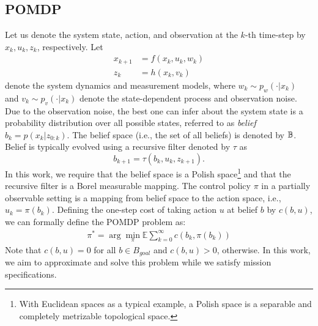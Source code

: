 \documentclass[letterpaper]{article} %
\begin{document}
	\subsection{POMDP}
	Let us denote the system state, action, and observation at the $k$-th time-step by $x_k, u_k, z_k$, respectively. Let
	\begin{align}
	x_{k+1} &= f(x_k,u_k,w_k) \label{eq:dynamics} \\
	z_k &= h(x_k,v_k) \label{eq:observations}
	\end{align}
	denote the system dynamics and measurement models, where $w_k\sim p_w(\cdot|x_k)$ and $v_k\sim p_v(\cdot|x_k)$ denote the state-dependent process and observation noise. Due to the observation noise, the best one can infer about the system state is a probability distribution over all possible states, referred to as \emph{belief} $b_k=p(x_k|z_{0:k})$. The belief space (i.e., the set of all beliefs) is denoted by $\mathbb{B}$. Belief is typically evolved using a recursive filter denoted by $\tau$ as
	\begin{equation}
	\label{eq:filter}
	b_{k+1}=\tau(b_k,u_k,z_{k+1}).
	\end{equation}
    In this work, we require that the belief space is a Polish space\footnote{With Euclidean spaces as a typical example, a Polish space is a separable and completely metrizable topological space.} and that the recursive filter is a Borel measurable mapping.
%
%
    The control policy $\pi$ in a partially observable setting is a mapping from belief space to the action space, i.e., $u_k=\pi(b_k)$. Defining the one-step cost of taking action $u$ at belief $b$ by $c(b,u)$, we can formally define the POMDP problem as: 
    \begin{align}
    \pi^*=\arg\min_\pi\mathbb{E}\sum_{k=0}^{\infty}c(b_k,\pi(b_k))
    \end{align}
    Note that $c(b,u)=0$ for all $b\in B_{goal}$ and $c(b,u)>0$, otherwise. In this work, we aim to approximate and solve this problem while we satisfy mission specifications.
    
\end{document}
